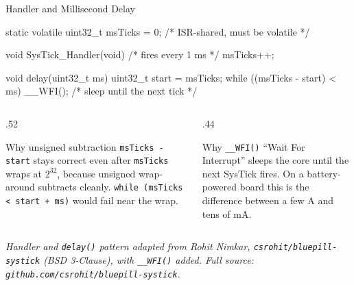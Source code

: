 \documentclass[9pt,aspectratio=169,xcolor=table]{beamer}
\begin{document}
{\beamerextras
\begin{frame}[fragile]{Handler and Millisecond Delay}
\begin{cc}[basicstyle=\ttfamily\footnotesize]
static volatile uint32_t msTicks = 0;    /* ISR-shared, must be volatile */

void SysTick_Handler(void) {             /* fires every 1 ms */
    msTicks++;
}

void delay(uint32_t ms) {
    uint32_t start = msTicks;
    while ((msTicks - start) < ms) {
        __WFI();                         /* sleep until the next tick */
    }
}
\end{cc}

    \vspace{2mm}
    \begin{columns}[T]
    \begin{column}{.52\textwidth}
        \begin{block}{Why unsigned subtraction}
            {\footnotesize \texttt{msTicks - start} stays correct even
            after \texttt{msTicks} wraps at $2^{32}$, because unsigned
            wrap-around subtracts cleanly. \texttt{while (msTicks < start
            + ms)} would \alert{fail} near the wrap.}
        \end{block}
    \end{column}
    \begin{column}{.44\textwidth}
        \begin{block}{Why \texttt{\_\_WFI()}}
            {\footnotesize ``Wait For Interrupt'' sleeps the core until the
            next SysTick fires. On a battery-powered board this is the
            difference between a few \textmu A and tens of mA.}
        \end{block}
    \end{column}
    \end{columns}

    \vspace{2mm}
    {\scriptsize\centering\emph{Handler and \texttt{delay()} pattern adapted
    from Rohit Nimkar, \texttt{csrohit/bluepill-systick} (BSD 3-Clause),
    with \texttt{\_\_WFI()} added. Full source:
    \texttt{github.com/csrohit/bluepill-systick}.}\par}
\end{frame}
}
\end{document}

